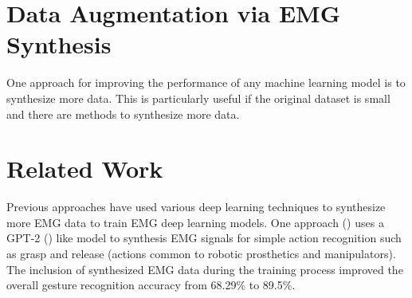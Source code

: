 \section{Data Augmentation via EMG Synthesis}

One approach for improving the performance of any machine learning model
is to synthesize more data. This is particularly useful if the original
dataset is small and there are methods to synthesize more data.

\section{Related Work}

Previous approaches have used various deep learning techniques to synthesize
more EMG data to train EMG deep learning models. One approach
(\cite{gpt_2_emg_synth}) uses a GPT-2 (\cite{gpt_2_original}) like model
to synthesis EMG signals for simple action recognition such as grasp and
release (actions common to robotic prosthetics and manipulators). The inclusion
of synthesized EMG data during the training process improved the overall
gesture recognition accuracy from 68.29\% to 89.5\%.